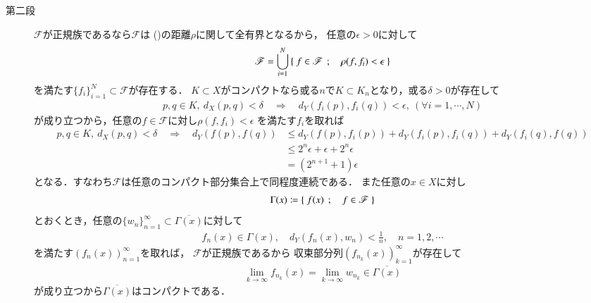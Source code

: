 \begin{prf}
\begin{description}
			\item[第二段] 
				$\mathscr{F}$が正規族であるなら$\mathscr{F}$は
				()の距離$\rho$に関して全有界となるから，
				任意の$\epsilon > 0$に対して
				\begin{align}
					\mathscr{F}
					= \bigcup_{i=1}^N \left\{\ f \in \mathscr{F}\ \, ; \quad \rho(f,f_i) < \epsilon\ \right\}
				\end{align}
				を満たす$\{f_i\}_{i=1}^N \subset \mathscr{F}$が存在する．
				$K \subset X$がコンパクトなら或る$n$で$K \subset K_n$となり，或る$\delta > 0$が存在して
				\begin{align}
					p,q \in K,\ d_X(p,q) < \delta
					\quad \Longrightarrow \quad
					d_Y(f_i(p),f_i(q)) < \epsilon,\ (\forall i = 1,\cdots,N)
				\end{align}
				が成り立つから，任意の$f \in \mathscr{F}$に対し$\rho(f,f_i) < \epsilon$
				を満たす$f_i$を取れば
				\begin{align}
					p,q \in K,\ d_X(p,q) < \delta
					\quad \Longrightarrow \quad
					d_Y(f(p),f(q)) 
					&\leq d_Y(f(p),f_i(p)) + d_Y(f_i(p),f_i(q)) + d_Y(f_i(q),f(q)) \\
					&\leq 2^n \epsilon + \epsilon + 2^n \epsilon \\
					&= (2^{n+1} + 1)\epsilon
				\end{align}
				となる．すなわち$\mathscr{F}$は任意のコンパクト部分集合上で同程度連続である．
				また任意の$x \in X$に対し
				\begin{align}
					\Gamma(x) \coloneqq \left\{\ f(x)\ \, ; \quad f \in \mathscr{F}\ \right\}
				\end{align}
				とおくとき，任意の$\{w_n\}_{n=1}^\infty \subset \overline{\Gamma(x)}$に対して
				\begin{align}
					f_n(x) \in \Gamma(x),
					\quad d_Y(f_n(x),w_n) < \frac{1}{n}, \quad n=1,2,\cdots
				\end{align}
				を満たす$\left(f_n(x)\right)_{n=1}^\infty$を取れば，
				$\mathscr{F}$が正規族であるから
				収束部分列$\left(f_{n_k}(x)\right)_{k=1}^\infty$が存在して
				\begin{align}
					\lim_{k \to \infty} f_{n_k}(x)
					= \lim_{k \to \infty} w_{n_k}
					\in \overline{\Gamma(x)}
				\end{align}
				が成り立つから$\overline{\Gamma(x)}$はコンパクトである．
				\QED
		\end{description}
	\end{prf}